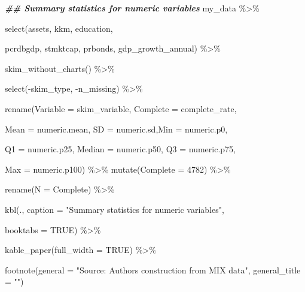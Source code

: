 \documentclass[a4paper,nobind]{templates/ociamthesis}
\newenvironment{Shaded}{\begin{snugshade}}{\end{snugshade}}
\newcommand{\AttributeTok}[1]{\textcolor[rgb]{0.77,0.63,0.00}{#1}}
\newcommand{\ConstantTok}[1]{\textcolor[rgb]{0.00,0.00,0.00}{#1}}
\newcommand{\DecValTok}[1]{\textcolor[rgb]{0.00,0.00,0.81}{#1}}
\newcommand{\DocumentationTok}[1]{\textcolor[rgb]{0.56,0.35,0.01}{\textbf{\textit{#1}}}}
\newcommand{\FunctionTok}[1]{\textcolor[rgb]{0.00,0.00,0.00}{#1}}
\newcommand{\NormalTok}[1]{#1}
\newcommand{\SpecialCharTok}[1]{\textcolor[rgb]{0.00,0.00,0.00}{#1}}
\newcommand{\StringTok}[1]{\textcolor[rgb]{0.31,0.60,0.02}{#1}}
\renewenvironment{Shaded}
{
  \vspace{10pt}%
  \begin{snugshade}%
}{%
  \end{snugshade}%
  \vspace{8pt}%
}
\begin{document}
\begin{Shaded}
\begin{Highlighting}[]
\DocumentationTok{\#\# Summary statistics for numeric variables }
\NormalTok{my\_data }\SpecialCharTok{\%\textgreater{}\%} 
  
  \FunctionTok{select}\NormalTok{(assets, kkm, education, }
         
\NormalTok{         pcrdbgdp, stmktcap, prbonds, gdp\_growth\_annual) }\SpecialCharTok{\%\textgreater{}\%} 
  
  \FunctionTok{skim\_without\_charts}\NormalTok{() }\SpecialCharTok{\%\textgreater{}\%} 
  
  \FunctionTok{select}\NormalTok{(}\SpecialCharTok{{-}}\NormalTok{skim\_type, }\SpecialCharTok{{-}}\NormalTok{n\_missing) }\SpecialCharTok{\%\textgreater{}\%} 
  
  \FunctionTok{rename}\NormalTok{(}\AttributeTok{Variable =}\NormalTok{ skim\_variable, }\AttributeTok{Complete =}\NormalTok{ complete\_rate, }
         
         \AttributeTok{Mean =}\NormalTok{ numeric.mean, }\AttributeTok{SD =}\NormalTok{ numeric.sd,}\AttributeTok{Min =}\NormalTok{ numeric.p0,}
         
         \AttributeTok{Q1 =}\NormalTok{ numeric.p25, }\AttributeTok{Median =}\NormalTok{ numeric.p50, }\AttributeTok{Q3 =}\NormalTok{ numeric.p75,}
         
         \AttributeTok{Max =}\NormalTok{ numeric.p100) }\SpecialCharTok{\%\textgreater{}\%} 
  \FunctionTok{mutate}\NormalTok{(}\AttributeTok{Complete =} \DecValTok{4782}\NormalTok{) }\SpecialCharTok{\%\textgreater{}\%} 
  
  \FunctionTok{rename}\NormalTok{(}\AttributeTok{N =}\NormalTok{ Complete) }\SpecialCharTok{\%\textgreater{}\%} 
  
  \FunctionTok{kbl}\NormalTok{(., }\AttributeTok{caption =} \StringTok{"Summary statistics for numeric variables"}\NormalTok{, }
      
      \AttributeTok{booktabs =} \ConstantTok{TRUE}\NormalTok{) }\SpecialCharTok{\%\textgreater{}\%} 
  
  \FunctionTok{kable\_paper}\NormalTok{(}\AttributeTok{full\_width =} \ConstantTok{TRUE}\NormalTok{) }\SpecialCharTok{\%\textgreater{}\%} 
  
  \FunctionTok{footnote}\NormalTok{(}\AttributeTok{general =} \StringTok{"Source: Authors\textquotesingle{} construction from MIX data"}\NormalTok{,}
           \AttributeTok{general\_title =} \StringTok{""}\NormalTok{)}
\end{Highlighting}
\end{Shaded}
\end{document}
